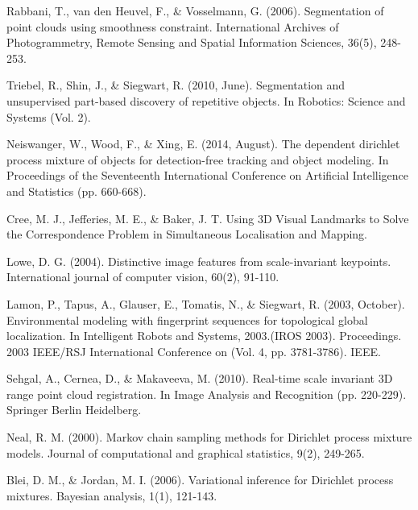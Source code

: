 \documentclass[]{article}
\begin{document}
\begin{thebibliography}{99}
            \newblock Rabbani, T., van den Heuvel, F., \& Vosselmann, G. (2006). Segmentation of point clouds using smoothness constraint. International Archives of Photogrammetry, Remote Sensing and Spatial Information Sciences, 36(5), 248-253.

            \newblock Triebel, R., Shin, J., \& Siegwart, R. (2010, June). Segmentation and unsupervised part-based discovery of repetitive objects. In Robotics: Science and Systems (Vol. 2).

            \newblock Neiswanger, W., Wood, F., \& Xing, E. (2014, August). The dependent dirichlet process mixture of objects for detection-free tracking and object modeling. In Proceedings of the Seventeenth International Conference on Artificial Intelligence and Statistics (pp. 660-668).

            \newblock Cree, M. J., Jefferies, M. E., \& Baker, J. T. Using 3D Visual Landmarks to Solve the Correspondence Problem in Simultaneous Localisation and Mapping.

            \newblock Lowe, D. G. (2004). Distinctive image features from scale-invariant keypoints. International journal of computer vision, 60(2), 91-110.

            \newblock Lamon, P., Tapus, A., Glauser, E., Tomatis, N., \& Siegwart, R. (2003, October). Environmental modeling with fingerprint sequences for topological global localization. In Intelligent Robots and Systems, 2003.(IROS 2003). Proceedings. 2003 IEEE/RSJ International Conference on (Vol. 4, pp. 3781-3786). IEEE.


            \newblock Sehgal, A., Cernea, D., \& Makaveeva, M. (2010). Real-time scale invariant 3D range point cloud registration. In Image Analysis and Recognition (pp. 220-229). Springer Berlin Heidelberg.

            \newblock Neal, R. M. (2000). Markov chain sampling methods for Dirichlet process mixture models. Journal of computational and graphical statistics, 9(2), 249-265.

            \newblock Blei, D. M., \& Jordan, M. I. (2006). Variational inference for Dirichlet process mixtures. Bayesian analysis, 1(1), 121-143.



\end{thebibliography}
\end{document}
